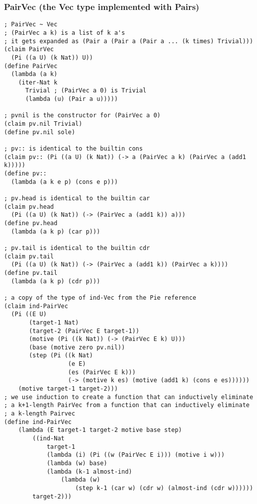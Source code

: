 \subsubsection{PairVec (the Vec type implemented with Pairs)} \label{code:PairVec}
\begin{lstlisting}
; PairVec ~ Vec
; (PairVec a k) is a list of k a's
; it gets expanded as (Pair a (Pair a (Pair a ... (k times) Trivial)))
(claim PairVec
  (Pi ((a U) (k Nat)) U))
(define PairVec
  (lambda (a k)
    (iter-Nat k
      Trivial ; (PairVec a 0) is Trivial
      (lambda (u) (Pair a u)))))

; pvnil is the constructor for (PairVec a 0)
(claim pv.nil Trivial)
(define pv.nil sole)

; pv:: is identical to the builtin cons
(claim pv:: (Pi ((a U) (k Nat)) (-> a (PairVec a k) (PairVec a (add1 k)))))
(define pv::
  (lambda (a k e p) (cons e p)))

; pv.head is identical to the builtin car
(claim pv.head
  (Pi ((a U) (k Nat)) (-> (PairVec a (add1 k)) a)))
(define pv.head
  (lambda (a k p) (car p)))

; pv.tail is identical to the builtin cdr
(claim pv.tail
  (Pi ((a U) (k Nat)) (-> (PairVec a (add1 k)) (PairVec a k))))
(define pv.tail
  (lambda (a k p) (cdr p)))

; a copy of the type of ind-Vec from the Pie reference
(claim ind-PairVec
  (Pi ((E U)
       (target-1 Nat)
       (target-2 (PairVec E target-1))
       (motive (Pi ((k Nat)) (-> (PairVec E k) U)))
       (base (motive zero pv.nil))
       (step (Pi ((k Nat)
                  (e E)
                  (es (PairVec E k)))
                  (-> (motive k es) (motive (add1 k) (cons e es))))))
    (motive target-1 target-2)))
; we use induction to create a function that can inductively eliminate
; a k+1-length PairVec from a function that can inductively eliminate
; a k-length Pairvec
(define ind-PairVec
    (lambda (E target-1 target-2 motive base step)
        ((ind-Nat
            target-1
            (lambda (i) (Pi ((w (PairVec E i))) (motive i w)))
            (lambda (w) base)
            (lambda (k-1 almost-ind)
                (lambda (w)
                    (step k-1 (car w) (cdr w) (almost-ind (cdr w))))))
        target-2)))
\end{lstlisting}


